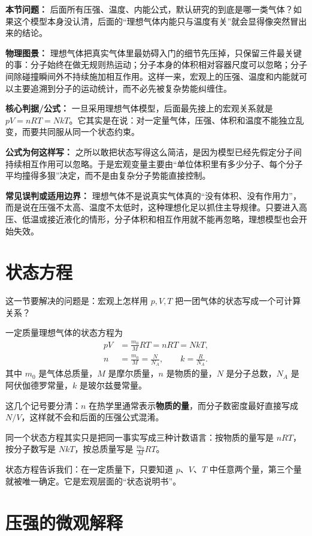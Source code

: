 \documentclass[lang=cn,11pt]{elegantbook}
\newcommand{\bridge}[1]{\begin{note}#1\end{note}}
\begin{document}
\textbf{本节问题：} 后面所有压强、温度、内能公式，默认研究的到底是哪一类气体？如果这个模型本身没认清，后面的“理想气体内能只与温度有关”就会显得像突然冒出来的结论。

\textbf{物理图景：} 理想气体把真实气体里最妨碍入门的细节先压掉，只保留三件最关键的事：分子始终在做无规则热运动；分子本身的体积相对容器尺度可以忽略；分子间除碰撞瞬间外不持续施加相互作用。这样一来，宏观上的压强、温度和内能就可以主要追溯到分子的运动统计，而不必先被复杂势能纠缠住。

\textbf{核心判据/公式：} 一旦采用理想气体模型，后面最先接上的宏观关系就是 \(pV=nRT=NkT\)。它其实是在说：对一定量气体，压强、体积和温度不能独立乱变，而要共同服从同一个状态约束。

\textbf{公式为何这样写：} 之所以敢把状态写得这么简洁，是因为模型已经先假定分子间持续相互作用可以忽略。于是宏观变量主要由“单位体积里有多少分子、每个分子平均撞得多狠”决定，而不是由复杂分子势能直接控制。

\textbf{常见误判或适用边界：} 理想气体不是说真实气体真的“没有体积、没有作用力”，而是说在压强不太高、温度不太低时，这种理想化足以抓住主导规律。只要进入高压、低温或接近液化的情形，分子体积和相互作用就不能再忽略，理想模型也会开始失效。

\section{状态方程}

这一节要解决的问题是：宏观上怎样用 \(p,V,T\) 把一团气体的状态写成一个可计算关系？

一定质量理想气体的状态方程为
\[
\begin{aligned}
pV&=\frac{m_0}{M}RT=nRT=NkT,\\
n&=\frac{m_0}{M}=\frac{N}{N_A},\qquad k=\frac{R}{N_A}.
\end{aligned}
\]
其中 \(m_0\) 是气体总质量，\(M\) 是摩尔质量，\(n\) 是物质的量，\(N\) 是分子总数，\(N_A\) 是阿伏伽德罗常量，\(k\) 是玻尔兹曼常量。

\bridge{这几个记号要分清：\(n\) 在热学里通常表示\textbf{物质的量}，而分子数密度最好直接写成 \(N/V\)，这样就不会和后面的压强公式混淆。}

\bridge{同一个状态方程其实只是把同一事实写成三种计数语言：按物质的量写是 \(nRT\)，按分子数写是 \(NkT\)，按总质量写是 \(\frac{m_0}{M}RT\)。}

状态方程告诉我们：在一定质量下，只要知道 \(p\)、\(V\)、\(T\) 中任意两个量，第三个量就被唯一确定。它是宏观层面的“状态说明书”。

\section{压强的微观解释}
\end{document}
